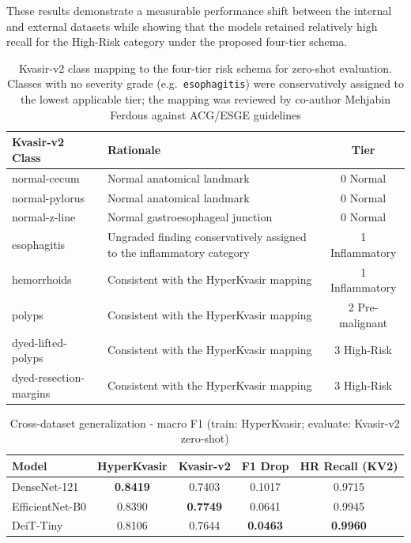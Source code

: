 \documentclass[11pt,a4paper]{article}
\begin{document}
These results demonstrate a measurable performance shift between the internal
and external datasets while showing that the models retained relatively high
recall for the High-Risk category under the proposed four-tier schema.

\begin{table}[H]
\centering
\caption{Kvasir-v2 class mapping to the four-tier risk schema for zero-shot evaluation.
  Classes with no severity grade (e.g.\ \texttt{esophagitis}) were conservatively
  assigned to the lowest applicable tier; the mapping was reviewed by co-author
  Mehjabin Ferdous against ACG/ESGE guidelines}
\label{tab:kv2_mapping}
\begin{tabular}{lp{7cm}c}
\toprule
\textbf{Kvasir-v2 Class} & \textbf{Rationale} & \textbf{Tier}\\
\midrule
normal-cecum & Normal anatomical landmark & 0 Normal\\
normal-pylorus & Normal anatomical landmark & 0 Normal\\
normal-z-line & Normal gastroesophageal junction & 0 Normal\\
esophagitis & Ungraded finding conservatively assigned to the inflammatory category & 1 Inflammatory\\
hemorrhoids & Consistent with the HyperKvasir mapping & 1 Inflammatory\\
polyps & Consistent with the HyperKvasir mapping & 2 Pre-malignant\\
dyed-lifted-polyps & Consistent with the HyperKvasir mapping & 3 High-Risk\\
dyed-resection-margins & Consistent with the HyperKvasir mapping & 3 High-Risk\\
\bottomrule
\end{tabular}
\end{table}

\begin{table}[H]
\centering
\caption{Cross-dataset generalization - macro F1 (train: HyperKvasir;
  evaluate: Kvasir-v2 zero-shot)}
\label{tab:xdataset}
\begin{tabular}{lcccc}
\toprule
\textbf{Model} & \textbf{HyperKvasir} &
\textbf{Kvasir-v2} & \textbf{F1 Drop} & \textbf{HR Recall (KV2)}\\
\midrule
DenseNet-121    & \textbf{0.8419} & 0.7403 & 0.1017 & 0.9715\\
EfficientNet-B0 & 0.8390 & \textbf{0.7749} & 0.0641 & 0.9945\\
DeiT-Tiny       & 0.8106 & 0.7644 & \textbf{0.0463} & \textbf{0.9960}\\
\bottomrule
\end{tabular}
\end{table}
\end{document}
